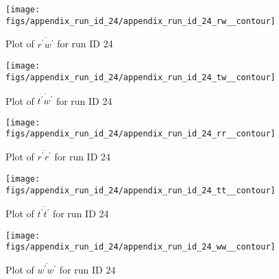 \begin{figure}[H]
\centering
\texttt{[image: figs/appendix\_run\_id\_24/appendix\_run\_id\_24\_rw\_\_contour]}
\caption{Plot of $\overline{r^\prime w^\prime}$ for run ID 24}
\label{fig:appendix_run_id_24_rw__contour}
\end{figure}


\begin{figure}[H]
\centering
\texttt{[image: figs/appendix\_run\_id\_24/appendix\_run\_id\_24\_tw\_\_contour]}
\caption{Plot of $\overline{t^\prime w^\prime}$ for run ID 24}
\label{fig:appendix_run_id_24_tw__contour}
\end{figure}


\begin{figure}[H]
\centering
\texttt{[image: figs/appendix\_run\_id\_24/appendix\_run\_id\_24\_rr\_\_contour]}
\caption{Plot of $\overline{r^\prime r^\prime}$ for run ID 24}
\label{fig:appendix_run_id_24_rr__contour}
\end{figure}


\begin{figure}[H]
\centering
\texttt{[image: figs/appendix\_run\_id\_24/appendix\_run\_id\_24\_tt\_\_contour]}
\caption{Plot of $\overline{t^\prime t^\prime}$ for run ID 24}
\label{fig:appendix_run_id_24_tt__contour}
\end{figure}


\begin{figure}[H]
\centering
\texttt{[image: figs/appendix\_run\_id\_24/appendix\_run\_id\_24\_ww\_\_contour]}
\caption{Plot of $\overline{w^\prime w^\prime}$ for run ID 24}
\label{fig:appendix_run_id_24_ww__contour}
\end{figure}


